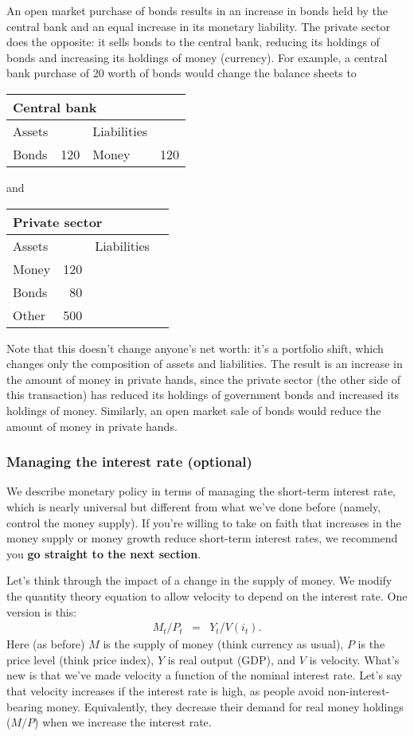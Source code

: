\documentclass[letterpaper,12pt]{article}
\begin{document}
An open market purchase of bonds results in an increase
in bonds held by the central bank and an equal increase in its
monetary liability.
The private sector does the opposite:  it sells bonds to
the central bank, reducing its holdings of bonds and
increasing its holdings of money (currency).
For example, a central bank purchase of 20 worth of bonds would change
the balance sheets to
%
\begin{center}
\begin{tabular}{lr|lr}
\multicolumn{4}{l}{Central bank} \\
\hline
Assets  &&  Liabilities \\
\hline
Bonds &  120 & Money & 120
\end{tabular}
\end{center}
%
and
%
\begin{center}
\begin{tabular}{lr|lr}
\multicolumn{4}{l}{Private sector} \\
\hline
Assets  &&  Liabilities \\
\hline
Money &  120  &  \phantom{Money} & \phantom{100} \\
Bonds &  \phantom{1}80 \\
Other &  500
\end{tabular}
\end{center}
%
Note that this doesn't change anyone's net worth:
it's a portfolio shift, which changes only the composition
of assets and liabilities.
The result is an increase in the amount of money in private hands,
since the private sector (the other side of this transaction)
has reduced its holdings of government bonds
and increased its holdings of money.
Similarly, an open market sale of bonds would reduce the amount of money in
private hands.


\subsubsection*{Managing the interest rate (optional)}

We describe monetary policy in terms of
managing the short-term interest rate,
which is nearly universal but different from what we've done before
(namely, control the money supply).
If you're willing to take on faith that increases in the money supply
or money growth reduce short-term interest rates,
we recommend you {\bf go straight to the next section}.

Let's think through the impact of a change in the supply of money.
We modify the  quantity theory equation to allow velocity to depend
on the interest rate.
One version is this:
%
\begin{eqnarray}
    M_t/P_t  &=&  Y_t / V(i_t) .
    \label{eq:md}
\end{eqnarray}
%
Here (as before) $M$ is the supply of money (think currency
as usual),
$P$ is the price level (think price index),
$Y$ is real output (GDP),
and $V$ is velocity.
What's new is that we've made velocity a function of the nominal interest rate.
Let's say that velocity increases if the interest rate is high, 
as people avoid non-interest-bearing money.  
Equivalently, they decrease their demand for real money holdings 
($M/P$) when we increase the interest rate.  
\end{document}

